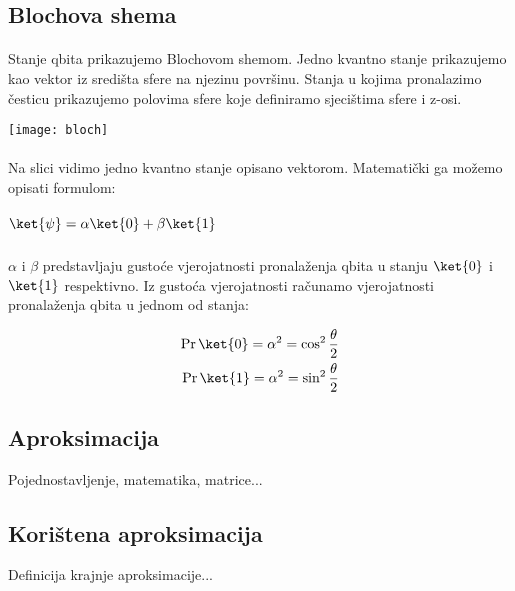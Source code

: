 \documentclass[times, utf8, zavrsni]{fer}
\begin{document}
\subsection{Blochova shema}
\paragraph{}
Stanje qbita prikazujemo Blochovom shemom. Jedno kvantno stanje prikazujemo kao vektor iz središta sfere na njezinu površinu. Stanja u kojima pronalazimo česticu prikazujemo polovima sfere koje definiramo sjecištima sfere i z-osi.

\begin{center}
\texttt{[image: bloch]}
\end{center}

\paragraph{}
Na slici vidimo jedno kvantno stanje opisano vektorom. Matematički ga možemo opisati formulom:

\subparagraph{
$ \ket{\psi} = \alpha\ket{0} + \beta\ket{1} $
}


\paragraph{}
$\alpha$ i $\beta$ predstavljaju gustoće vjerojatnosti pronalaženja qbita u stanju $\ket{0}$ i $\ket{1}$ respektivno. Iz gustoća vjerojatnosti računamo vjerojatnosti pronalaženja qbita u jednom od stanja:

\begin{equation} \label{eql}
\begin{split}
\Pr{\ket{0}} = \alpha^{2} = \cos^{2}{\frac{\theta}{2}} \\ 
\Pr{\ket{1}} = \alpha^{2} = \sin^{2}{\frac{\theta}{2}}
\end{split}
\end{equation}

\subsection{Aproksimacija}
Pojednostavljenje, matematika, matrice...

\subsection{Korištena aproksimacija}
Definicija krajnje aproksimacije...
\end{document}

